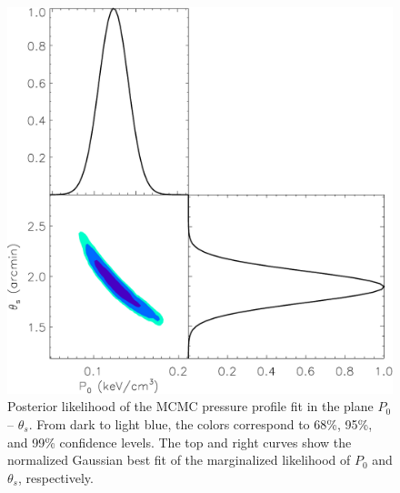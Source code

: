 	\begin{figure}	
	\centering
	\includegraphics[width=\columnwidth]{Figure/lik_mask80_rxj_comp.pdf}	
	\caption{Posterior likelihood of the MCMC pressure profile fit in the plane $P_0$ -- $\theta_s$. From dark to light blue, the colors correspond to 68\%, 95\%, and 99\% confidence levels. The top and right curves show the normalized Gaussian best fit of the marginalized likelihood of $P_0$ and $\theta_s$, respectively.}
        \label{fig:likelihood}
	\end{figure}

